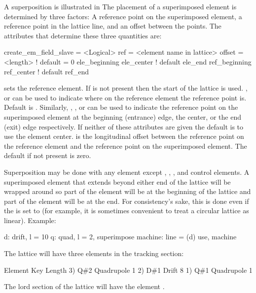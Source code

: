 A superposition is illustrated in  The
placement of a superimposed element is determined by three factors: A
reference point on the superimposed element, a reference point in the
lattice line, and an offset between the points. The attributes that
determine these three quantities are: 
\begin{example}
  create_em_field_slave = <Logical>
  ref                   = <element name in lattice>
  offset                = <length>      ! default = 0
  ele_beginning
  ele_center                            ! default
  ele_end
  ref_beginning
  ref_center                            ! default
  ref_end
\end{example}
 sets the reference element. If  is not present then
the start of the lattice is used. , 
or  can be used to indicate where on the reference element
the reference point is. Default is . Similarly,
, , or  can be used to
indicate the reference point on the superimposed element at the
beginning (entrance) edge, the center, or the end (exit) edge
respectively. If neither of these attributes are given the default is
to use the element center.  is the longitudinal offset
between the reference point on the reference element and the reference
point on the superimposed element. The default if not present is zero.

Superposition may be done with any element except ,
, , and  control elements. A
superimposed element that extends beyond either end of the lattice
will be wrapped around so part of the element will be at the beginning
of the lattice and part of the element will be at the end. For
consistency's sake, this is done even if the  is set
to  (for example, it is sometimes convenient to
treat a circular lattice as linear). Example:
\begin{example}
  d: drift, l = 10
  q: quad, l = 2, superimpose
  machine: line = (d)
  use, machine
\end{example}
The lattice will have three elements in the tracking section:
\begin{example}
        Element   Key           Length
  3)    Q{\#}2       Quadrupole    1
  2)    D{\#}1       Drift         8
  1)    Q{\#}1       Quadrupole    1
\end{example}
The lord section of the lattice will have the element . 

